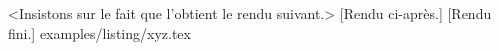 \bdoclatexshow*<Insistons sur le fait que l'obtient le rendu suivant.>%
               [Rendu ci-après.]%
               [Rendu fini.]%
               {examples/listing/xyz.tex}